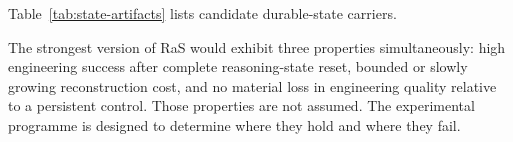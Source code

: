 Table~\ref{tab:state-artifacts} lists candidate durable-state carriers.



The strongest version of RaS would exhibit three properties simultaneously: high engineering success after complete reasoning-state reset, bounded or slowly growing reconstruction cost, and no material loss in engineering quality relative to a persistent control. Those properties are not assumed. The experimental programme is designed to determine where they hold and where they fail.
